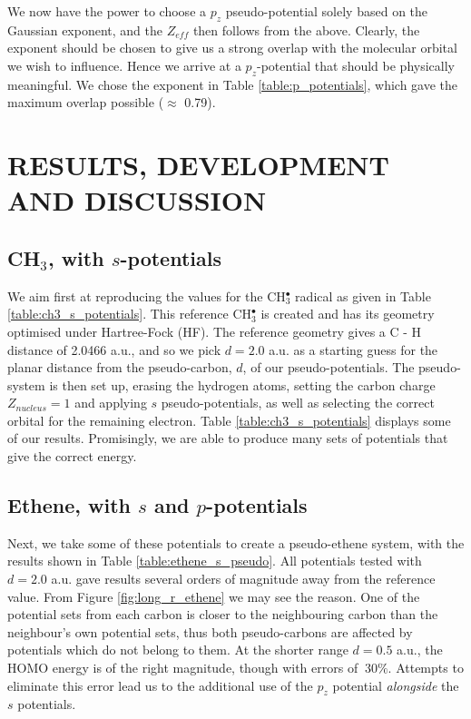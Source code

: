 \documentclass[12pt]{article}
\begin{document}
We now have the power to choose a \(p_{z}\) pseudo-potential solely based on the Gaussian exponent, and the \(Z_{eff}\) then follows from the above. Clearly, the exponent should be chosen to give us a strong overlap with the molecular orbital we wish to influence. Hence we arrive at a \(p_{z}\)-potential that should be physically meaningful. We chose the exponent in Table \ref{table:p_potentials}, which gave the maximum overlap possible ($\approx$ 0.79).

\section*{\sffamily \Large RESULTS, DEVELOPMENT AND DISCUSSION}
\subsection*{\sffamily \large CH\(_{3}\), with \(s\)-potentials}

We aim first at reproducing the values for the CH\(^{\bullet}_{3}\) radical as given in Table \ref{table:ch3_s_potentials}. 
This reference CH\(^{\bullet}_{3}\) is created and has its geometry optimised under Hartree-Fock (HF). The reference geometry gives a C - H distance of 2.0466 a.u., and so we pick \(d = 2.0\) a.u. as a starting guess for the planar distance from the pseudo-carbon, \(d\), of our pseudo-potentials. The pseudo-system is then set up, erasing the hydrogen atoms, setting the carbon charge \(Z_{nucleus} = 1\) and applying \(s\) pseudo-potentials, as well as selecting the correct orbital for the remaining electron. Table \ref{table:ch3_s_potentials} displays some of our results. Promisingly, we are able to produce many sets of potentials that give the correct energy.

\subsection*{\sffamily \large Ethene, with \(s\) and \(p\)-potentials}

Next, we take some of these potentials to create a pseudo-ethene system, with the results shown in Table \ref{table:ethene_s_pseudo}. All potentials tested with \(d = 2.0\) a.u. gave results several orders of magnitude away from the reference value. From Figure \ref{fig:long_r_ethene} we may see the reason. One of the potential sets from each carbon is closer to the neighbouring carbon than the neighbour's own potential sets, thus both pseudo-carbons are affected by potentials which do not belong to them. At the shorter range \(d = 0.5\) a.u., the HOMO energy is of the right magnitude, though with errors of \(~ 30\%\). Attempts to eliminate this error lead us to the additional use of the \(p_{z}\) potential \textit{alongside} the \(s\) potentials.
\end{document}
